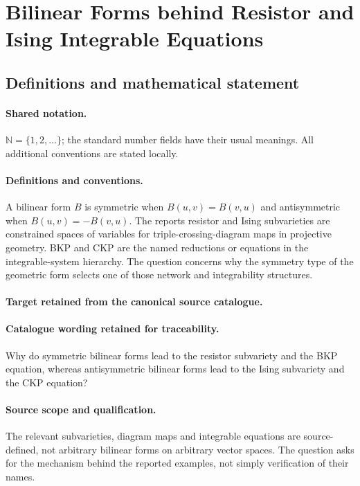 \documentclass[11pt]{article}
\begin{document}
\section{Bilinear Forms behind Resistor and Ising Integrable Equations}\label{statement}

\subsection{Definitions and mathematical statement}

\paragraph{Shared notation.}$\mathbb N=\{1,2,\ldots\}$; the standard number fields have their usual meanings. All additional conventions are stated locally.


\paragraph{Definitions and conventions.}
A bilinear form $B$ is symmetric when $B(u,v)=B(v,u)$ and antisymmetric when $B(u,v)=-B(v,u)$. The report\textquotesingle s resistor and Ising subvarieties are constrained spaces of variables for triple-crossing-diagram maps in projective geometry. BKP and CKP are the named reductions or equations in the integrable-system hierarchy. The question concerns why the symmetry type of the geometric form selects one of those network and integrability structures.

\paragraph{Target retained from the canonical source catalogue.}
\paragraph{Catalogue wording retained for traceability.}
Why do symmetric bilinear forms lead to the resistor subvariety and the BKP equation, whereas antisymmetric bilinear forms lead to the Ising subvariety and the CKP equation?

\paragraph{Source scope and qualification.}
The relevant subvarieties, diagram maps and integrable equations are source-defined, not arbitrary bilinear forms on arbitrary vector spaces. The question asks for the mechanism behind the reported examples, not simply verification of their names.
\end{document}
